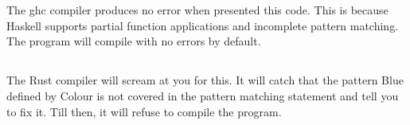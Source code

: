 \documentclass[letterpaper]{article}
\begin{document}
\section{}
\subsection{}
The ghc compiler produces no error when presented this code. This is because
Haskell supports partial function applications and incomplete pattern matching.
The program will compile with no errors by default.

\subsection{}
The Rust compiler will scream at you for this. It will catch that the pattern
Blue defined by Colour is not covered in the pattern matching statement and tell
you to fix it. Till then, it will refuse to compile the program.
\end{document}
